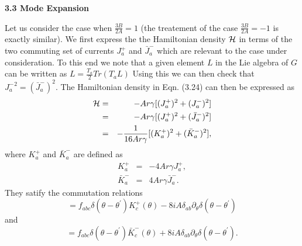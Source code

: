 \documentclass[a4paper,12pt]{article}
\begin{document}
\vskip 5mm
\noindent
{\bf 3.3 Mode Expansion}
\vskip 5mm
\noindent

Let us  consider  the case when $\frac{3B}{2A}=1$ 
(the treatement of the case $\frac{3B}{2A}=-1$ is exactly similar). 
We first express the the Hamiltonian density ${\cal H}$ in
terms of the two commuting
set of currents $J^{+}_{a}$ and ${\bar{J}}^{-}_{a}$ which are relevant to
the case under consideration. To this end we note that a given element $L$
in the Lie algebra of $G$ can be written as
$ L=\frac{T_a}{2}Tr(T_a L) $ 
Using this we  can then check that $ {J^{-}_{a}}^2=({\bar{J}}^{-}_{a})^2$.
The Hamiltonian density in Eqn. (3.24) can then be expressed as  
\begin{eqnarray}
{\cal H}&=&-Ar{\gamma}[(J^{+}_{a})^2 +(J^{-}_{a})^2 ]\nonumber\\
&=&-Ar{\gamma}[(J^{+}_{a})^2 +({\bar{J}}^{-}_{a})^2 ]\nonumber\\
&=&-\frac{1}{16Ar{\gamma}}[(K^{+}_{a})^2 +({\bar{K}}^{-}_{a})^2 ],
\end{eqnarray}
where $K^{+}_{a}$ and ${\bar{K}}^{-}_{a}$ are defined as 
\begin{eqnarray}
K^{+}_{a}&=&-4Ar{\gamma}J^{+}_{a},\nonumber\\
{\bar{K}}^{-}_{a}&=&4Ar{\gamma}{\bar{J}}^{-}_{a}.
\end{eqnarray}
 They  satify the commutation relations 
\begin{equation}
[ {K}^{+}_a(\theta) , {K}^{+}_b({\theta}^{'}) ]=f_{abc}{\delta}
({\theta} -{\theta}^{'}) {K}^{+}_{c}(\theta) 
-8iA{\delta}_{ab}{\partial}_{\theta}{\delta}({\theta} 
-{\theta}^{'})
\end{equation}
and
\begin{equation}
[ \bar{K}^{-}_a(\theta) , \bar{K}^{-}_b({\theta}^{'}) ]=
f_{abc}{\delta}({\theta} -{\theta}^{'}) \bar{K}^{-}_{c}(\theta) 
+8iA{\delta}_{ab}{\partial}_{\theta}{\delta}({\theta} 
-{\theta}^{'}).
\end{equation}
\end{document}
